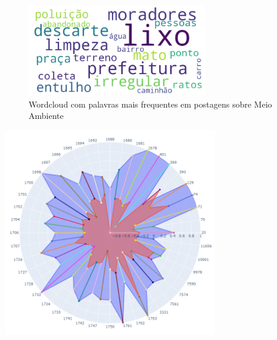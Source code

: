\begin{figure}[htb]
	\centering
	\includegraphics[width=0.7\textwidth]{images/wordcloud_environment.png}
	\caption{Wordcloud com palavras mais frequentes em postagens sobre Meio Ambiente}
	\label{fig:wordcloud_environment}
\end{figure}

\begin{quadro}[htb]
	\centering
	\includegraphics[width=0.7\textwidth]{images/social_barometer_environment.png}
	\caption{Gráfico de Radar ilustrando a pressão social em relação ao tópico de Meio Ambiente}
	\label{fig:social_barometer_environment}
\end{quadro}

